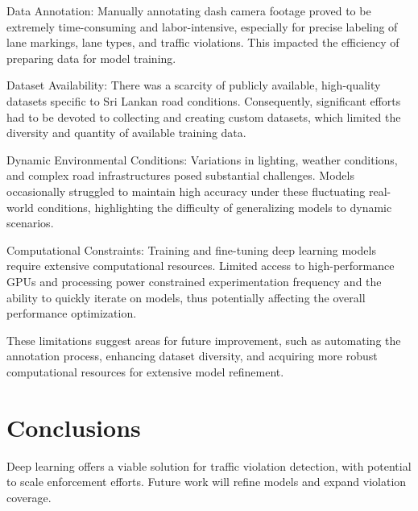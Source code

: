 \documentclass[12pt,a4paper]{article}
\begin{document}
Data Annotation:
Manually annotating dash camera footage proved to be extremely time-consuming and labor-intensive, especially for precise labeling of lane markings, lane types, and traffic violations. This impacted the efficiency of preparing data for model training.

Dataset Availability:
There was a scarcity of publicly available, high-quality datasets specific to Sri Lankan road conditions. Consequently, significant efforts had to be devoted to collecting and creating custom datasets, which limited the diversity and quantity of available training data.

Dynamic Environmental Conditions:
Variations in lighting, weather conditions, and complex road infrastructures posed substantial challenges. Models occasionally struggled to maintain high accuracy under these fluctuating real-world conditions, highlighting the difficulty of generalizing models to dynamic scenarios.

Computational Constraints:
Training and fine-tuning deep learning models require extensive computational resources. Limited access to high-performance GPUs and processing power constrained experimentation frequency and the ability to quickly iterate on models, thus potentially affecting the overall performance optimization.

These limitations suggest areas for future improvement, such as automating the annotation process, enhancing dataset diversity, and acquiring more robust computational resources for extensive model refinement.

\section{Conclusions}
Deep learning offers a viable solution for traffic violation detection, with potential to scale enforcement efforts. Future work will refine models and expand violation coverage.

\newpage
\end{document}
